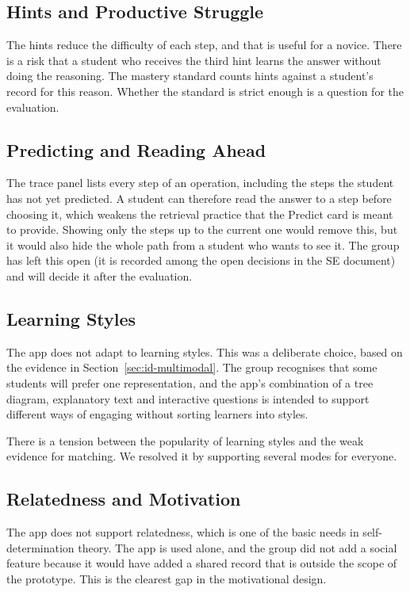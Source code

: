 \subsection{Hints and Productive Struggle}
The hints reduce the difficulty of each step, and that is useful for a novice. There is a risk that a student who receives the third hint learns the answer without doing the reasoning. The mastery standard counts hints against a student's record for this reason. Whether the standard is strict enough is a question for the evaluation.

\subsection{Predicting and Reading Ahead}
The trace panel lists every step of an operation, including the steps the student has not yet predicted. A student can therefore read the answer to a step before choosing it, which weakens the retrieval practice that the Predict card is meant to provide. Showing only the steps up to the current one would remove this, but it would also hide the whole path from a student who wants to see it. The group has left this open (it is recorded among the open decisions in the SE document) and will decide it after the evaluation.

\subsection{Learning Styles}
The app does not adapt to learning styles. This was a deliberate choice, based on the evidence in Section~\ref{sec:id-multimodal}. The group recognises that some students will prefer one representation, and the app's combination of a tree diagram, explanatory text and interactive questions is intended to support different ways of engaging without sorting learners into styles.

There is a tension between the popularity of learning styles and the weak evidence for matching. We resolved it by supporting several modes for everyone.

\subsection{Relatedness and Motivation}
The app does not support relatedness, which is one of the basic needs in self-determination theory. The app is used alone, and the group did not add a social feature because it would have added a shared record that is outside the scope of the prototype. This is the clearest gap in the motivational design.

